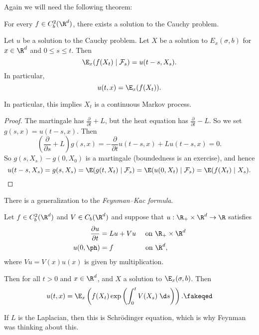 \documentclass[a4paper]{article}
\begin{document}
Again we will need the following theorem:
\begin{thm}
  For every $f \in C_b^2(\R^d)$, there exists a solution to the Cauchy problem.\fakeqed
\end{thm}

\begin{thm}
  Let $u$ be a solution to the Cauchy problem. Let $X$ be a solution to $E_x(\sigma, b)$ for $x \in \R^d$ and $0 \leq s \leq t$. Then
  \[
    \E_x(f(X_t) \mid \mathcal{F}_s) = u(t - s, X_s).
  \]
  In particular,
  \[
    u(t, x) = \E_x(f(X_t)).
  \]
\end{thm}
In particular, this implies $X_t$ is a continuous Markov process.

\begin{proof}
  The martingale has $\frac{\partial}{\partial t} + L$, but the heat equation has $\frac{\partial}{\partial t} - L$. So we set $g(s, x) = u(t - s, x)$. Then
  \[
    \left(\frac{\partial}{\partial s} + L\right) g(s, x) = - \frac{\partial}{\partial t} u(t - s, x) + Lu(t - s, x) = 0.
  \]
  So $g(s, X_s) - g(0, X_0)$ is a martingale (boundedness is an exercise), and hence
  \[
    u(t - s, X_s) = g(s, X_s) = \E (g(t, X_t) \mid \mathcal{F}_s) = \E(u(0, X_t) \mid \mathcal{F}_s) = \E(f(X_t) \mid X_s).\qedhere
  \]
\end{proof}

There is a generalization to the \emph{Feynman--Kac formula}.
\begin{thm}
  Let $f \in C_b^2(\R^d)$ and $V \in C_b(\R^d)$ and suppose that $u: \R_+ \times \R^d \to \R$ satisfies
  \begin{align*}
    \frac{\partial u}{\partial t} &= Lu + Vu \quad \text{ on }\R_+ \times \R^d\\
    u(0, \ph) &= f\hphantom{L+Vu}\quad \text{ on } \R^d,
  \end{align*}
  where $Vu = V(x) u(x)$ is given by multiplication.

  Then for all $t > 0$ and $x \in \R^d$, and $X$ a solution to $\E_x(\sigma, b)$. Then
  \[
    u(t, x) = \E_x\left(f(X_t) \exp \left(\int_0^t V(X_s)\;\d s\right)\right).\fakeqed
  \]
\end{thm}
If $L$ is the Laplacian, then this is Schr\"odinger equation, which is why Feynman was thinking about this.

\printindex
\end{document}
